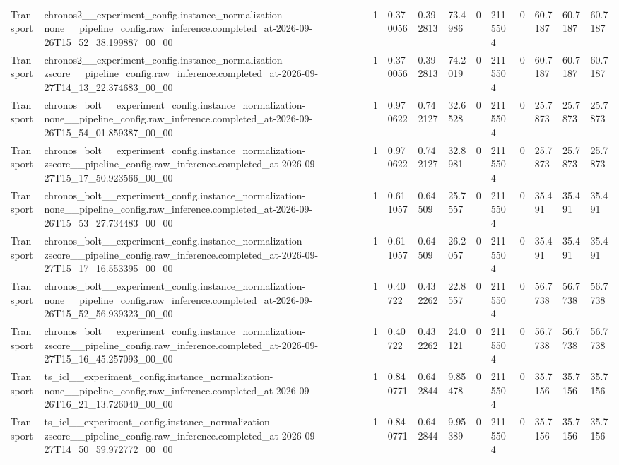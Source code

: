 \begin{tabular}{llllllllllll}
Transport & chronos2\_\_experiment\_config.instance\_normalization-none\_\_pipeline\_config.raw\_inference.completed\_at-2026-09-26T15\_52\_38.199887\_00\_00 & 1 & 0.370056 & 0.392813 & 73.4986 & 0 & 2115504 & 0 & 60.7187 & 60.7187 & 60.7187 \\
Transport & chronos2\_\_experiment\_config.instance\_normalization-zscore\_\_pipeline\_config.raw\_inference.completed\_at-2026-09-27T14\_13\_22.374683\_00\_00 & 1 & 0.370056 & 0.392813 & 74.2019 & 0 & 2115504 & 0 & 60.7187 & 60.7187 & 60.7187 \\
Transport & chronos\_bolt\_\_experiment\_config.instance\_normalization-none\_\_pipeline\_config.raw\_inference.completed\_at-2026-09-26T15\_54\_01.859387\_00\_00 & 1 & 0.970622 & 0.742127 & 32.6528 & 0 & 2115504 & 0 & 25.7873 & 25.7873 & 25.7873 \\
Transport & chronos\_bolt\_\_experiment\_config.instance\_normalization-zscore\_\_pipeline\_config.raw\_inference.completed\_at-2026-09-27T15\_17\_50.923566\_00\_00 & 1 & 0.970622 & 0.742127 & 32.8981 & 0 & 2115504 & 0 & 25.7873 & 25.7873 & 25.7873 \\
Transport & chronos\_bolt\_\_experiment\_config.instance\_normalization-none\_\_pipeline\_config.raw\_inference.completed\_at-2026-09-26T15\_53\_27.734483\_00\_00 & 1 & 0.611057 & 0.64509 & 25.7557 & 0 & 2115504 & 0 & 35.491 & 35.491 & 35.491 \\
Transport & chronos\_bolt\_\_experiment\_config.instance\_normalization-zscore\_\_pipeline\_config.raw\_inference.completed\_at-2026-09-27T15\_17\_16.553395\_00\_00 & 1 & 0.611057 & 0.64509 & 26.2057 & 0 & 2115504 & 0 & 35.491 & 35.491 & 35.491 \\
Transport & chronos\_bolt\_\_experiment\_config.instance\_normalization-none\_\_pipeline\_config.raw\_inference.completed\_at-2026-09-26T15\_52\_56.939323\_00\_00 & 1 & 0.40722 & 0.432262 & 22.8557 & 0 & 2115504 & 0 & 56.7738 & 56.7738 & 56.7738 \\
Transport & chronos\_bolt\_\_experiment\_config.instance\_normalization-zscore\_\_pipeline\_config.raw\_inference.completed\_at-2026-09-27T15\_16\_45.257093\_00\_00 & 1 & 0.40722 & 0.432262 & 24.0121 & 0 & 2115504 & 0 & 56.7738 & 56.7738 & 56.7738 \\
Transport & ts\_icl\_\_experiment\_config.instance\_normalization-none\_\_pipeline\_config.raw\_inference.completed\_at-2026-09-26T16\_21\_13.726040\_00\_00 & 1 & 0.840771 & 0.642844 & 9.85478 & 0 & 2115504 & 0 & 35.7156 & 35.7156 & 35.7156 \\
Transport & ts\_icl\_\_experiment\_config.instance\_normalization-zscore\_\_pipeline\_config.raw\_inference.completed\_at-2026-09-27T14\_50\_59.972772\_00\_00 & 1 & 0.840771 & 0.642844 & 9.95389 & 0 & 2115504 & 0 & 35.7156 & 35.7156 & 35.7156 \\

\end{tabular}
